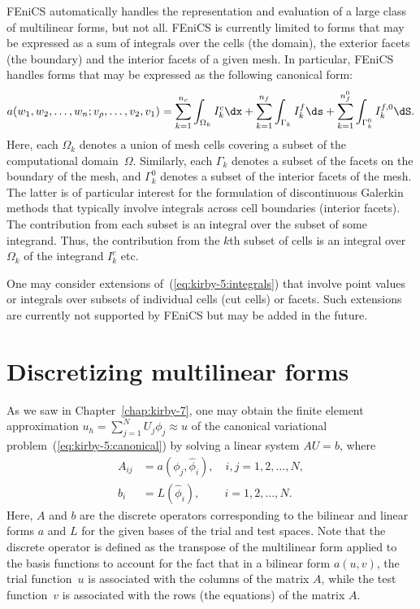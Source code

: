 FEniCS automatically handles the representation and evaluation of a
large class of multilinear forms, but not all. FEniCS is currently
limited to forms that may be expressed as a sum of integrals over the
cells (the domain), the exterior facets (the boundary) and the
interior facets of a given mesh. In particular, FEniCS handles forms
that may be expressed as the following canonical form:
\begin{equation} \label{eq:kirby-5:integrals}
  a(w_1, w_2, \ldots, w_n; v_{\rho}, \ldots, v_2, v_1)
  =
  \sum_{k=1}^{n_c}   \int_{\Omega_k} I^c_k \dx +
  \sum_{k=1}^{n_f}   \int_{\Gamma_k} I^f_k \ds +
  \sum_{k=1}^{n_f^0} \int_{\Gamma_k^0} I^{f,0}_k \dS.
\end{equation}
Here, each $\Omega_k$ denotes a union of mesh cells covering a subset
of the computational domain~$\Omega$. Similarly, each $\Gamma_k$
denotes a subset of the facets on the boundary of the mesh, and
$\Gamma_k^0$ denotes a subset of the interior facets of the
mesh. The latter is of particular interest for the formulation of
discontinuous Galerkin methods that typically involve integrals across
cell boundaries (interior facets). The contribution from each subset
is an integral over the subset of some integrand. Thus, the
contribution from the $k$th subset of cells is an integral over
$\Omega_k$ of the integrand $I^c_k$ etc.

One may consider extensions of~(\ref{eq:kirby-5:integrals}) that
involve point values or integrals over subsets of individual cells
(cut cells) or facets. Such extensions are currently not supported by
FEniCS but may be added in the future.

\section{Discretizing multilinear forms}
\label{sec:kirby-5:discretizing}

As we saw in Chapter~\ref{chap:kirby-7}, one may obtain the finite
element approximation $u_h = \sum_{j=1}^N U_j \phi_j \approx u$ of the
canonical variational problem~(\ref{eq:kirby-5:canonical}) by solving a
linear system $AU=b$, where
\begin{equation}
  \begin{split}
    A_{ij} &= a(\phi_j, \hat{\phi}_i), \quad i,j = 1,2,\ldots,N, \\
    b_i &= L(\hat{\phi}_i), \,\,\,\,\,\,\, \quad i = 1,2,\ldots,N.
  \end{split}
\end{equation}
Here, $A$ and $b$ are the discrete operators corresponding to the
bilinear and linear forms $a$ and $L$ for the given bases of the trial
and test spaces. Note that the discrete operator is defined as the
transpose of the multilinear form applied to the basis functions to
account for the fact that in a bilinear form $a(u, v)$, the trial
function~$u$ is associated with the columns of the matrix $A$,
while the test function~$v$ is associated with the rows (the
equations) of the matrix $A$.

